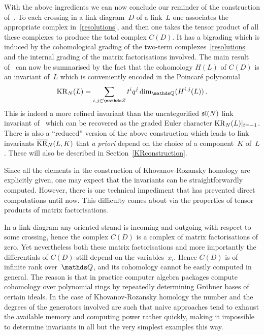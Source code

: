 \documentclass{compositio}
\theoremstyle{definition}
\numberwithin{equation}{section}
\begin{document}
With the above ingredients we can now conclude our reminder of the construction of~\cite{kr0401268}. To each crossing in a link diagram~$D$ of a link~$L$ one associates the appropriate complex in~\eqref{resolutions}, and then one takes the tensor product of all these complexes to produce the total complex $C(D)$. It has a bigrading which is induced by the cohomological grading of the two-term complexes~\eqref{resolutions} and the internal grading of the matrix factorisations involved. The main result of~\cite{kr0401268} can now be summarised by the fact that the cohomology $H(L)$ of $C(D)$ is an invariant of~$L$ which is conveniently encoded in the Poincar\'e polynomial
$$
\KR_{N}(L) = \sum_{i,j\in\nZ} t^{i} q^j \dim_{\nQ}(H^{i,j}(L)) \, . 
$$
This is indeed a more refined invariant than the uncategorified $\mathfrak{sl}(N)$ link invariant of~\cite{RT1990} which can be recovered as the graded Euler character $\operatorname{KR}_{N}(L)|_{t=-1}$. There is also a ``reduced'' version of the above construction which leads to link invariants $\overline{\operatorname{KR}}_{N}(L,K)$ that \emph{a priori} depend on the choice of a component~$K$ of~$L$. These will also be described in Section~\ref{KRconstruction}. 

\medskip

Since all the elements in the construction of Khovanov-Rozansky homology are explicitly given, one may expect that the invariants can be straightforwardly computed. However, there is one technical impediment that has prevented direct computations until now. This difficulty comes about via the properties of tensor products of matrix factorisations. 

In a link diagram any oriented strand is incoming and outgoing with respect to some crossing, hence the complex $C(D)$ is a complex of matrix factorisations of zero. Yet nevertheless both these matrix factorisations and more importantly the differentials of $C(D)$ still depend on the variables~$x_{i}$. Hence $C(D)$ is of infinite rank over~$\nQ$, and its cohomology cannot be easily computed in general. The reason is that in practice computer algebra packages compute cohomology over polynomial rings by repeatedly determining Gr\"obner bases of certain ideals. In the case of Khovanov-Rozansky homology the number and the degrees of the generators involved are such that naive approaches tend to exhaust the available memory and computing power rather quickly, making it impossible to determine invariants in all but the very simplest examples this way. 
\end{document}

